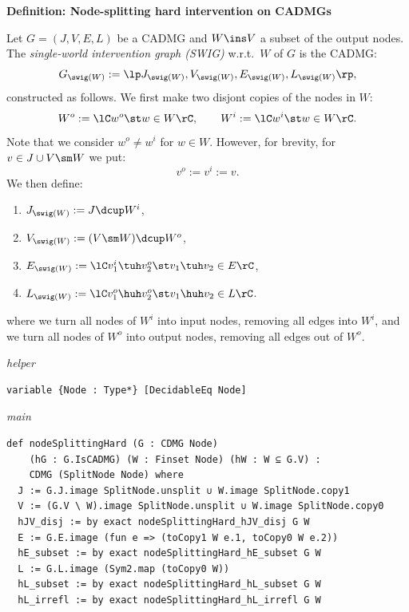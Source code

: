 \noindent\textbf{Definition: Node-splitting hard intervention on CADMGs}\par\smallskip
{\appendixTexSize
  \label{def:G_node-splitting_intervention}
    Let $G=(J,V,E,L)$ be a CADMG and $W \ins V$ a subset of the output nodes.
    The \emph{single-world intervention graph (SWIG)} w.r.t.\ $W$ of $G$ is the CADMG: 
    \[ G_{\swig(W)} :=\lp J_{\swig(W)}, V_{\swig(W)}, E_{\swig(W)},L_{\swig(W)} \rp,\]
    constructed as follows.
    We first make two disjont copies of the nodes in $W$:
    \[ W^o:=\lC w^o\st w \in W \rC, \qquad W^i:=\lC w^i \st w \in W \rC.  \]
    Note that we consider $w^o \neq w^i$ for $w \in W$.
  However, for brevity, for $v \in J \cup V \sm W$ we put:
  \[ v^o:=v^i:=v.  \]
  We then define:
  \begin{enumerate}[label=\roman*.)]
      \item $J_{\swig(W)} := J \dcup W^i$,
      \item $V_{\swig(W)} := (V \sm W) \dcup W^o$, %
      \item $E_{\swig(W)} := \lC v^i_1 \tuh v_2^o \st v_1 \tuh v_2 \in E  \rC$,
      \item $L_{\swig(W)} :=\lC v_1^o \huh v_2^o \st v_1 \huh v_2 \in L \rC$.
  \end{enumerate}
  where we turn all nodes of $W^i$ into input nodes, removing all edges into $W^i$,
  and we turn all nodes of $W^o$ into output nodes, removing all edges out of $W^o$.
\par}
\smallskip
{\small\textit{helper}}
\begin{verbatim}
variable {Node : Type*} [DecidableEq Node]
\end{verbatim}
{\small\textit{main}}
\begin{verbatim}
def nodeSplittingHard (G : CDMG Node)
    (hG : G.IsCADMG) (W : Finset Node) (hW : W ⊆ G.V) :
    CDMG (SplitNode Node) where
  J := G.J.image SplitNode.unsplit ∪ W.image SplitNode.copy1
  V := (G.V \ W).image SplitNode.unsplit ∪ W.image SplitNode.copy0
  hJV_disj := by exact nodeSplittingHard_hJV_disj G W
  E := G.E.image (fun e => (toCopy1 W e.1, toCopy0 W e.2))
  hE_subset := by exact nodeSplittingHard_hE_subset G W
  L := G.L.image (Sym2.map (toCopy0 W))
  hL_subset := by exact nodeSplittingHard_hL_subset G W
  hL_irrefl := by exact nodeSplittingHard_hL_irrefl G W
\end{verbatim}
~%

